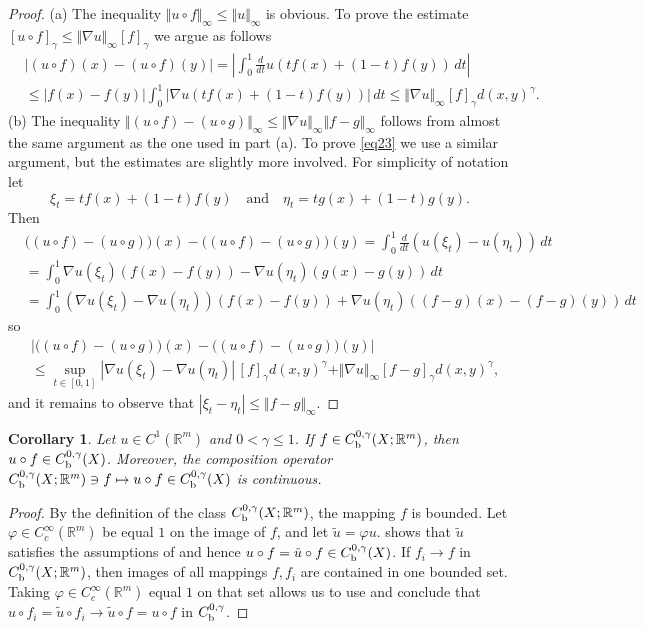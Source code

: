 \documentclass[intlimits,12pt,reqno]{amsart}
\newcommand{\bbbr}{\mathbb R}
\newcommand{\R}{\mathbb R}
\numberwithin{equation}{section}
\newtheorem{corollary}[theorem]{Corollary}
\theoremstyle{definition}
\begin{document}
\begin{proof}
(a) The inequality $\Vert u\circ f\Vert_\infty\leq \Vert u\Vert_\infty$ is obvious. To prove the estimate
$[u\circ f]_{\gamma}\leq\Vert\nabla u\Vert_\infty [f]_{\gamma}$ we argue as follows
\begin{align*}
&|(u\circ f)(x)-(u\circ f)(y)|
=
\left|\int_0^1\frac{d}{dt}u(tf(x)+(1-t)f(y))\, dt\right|\\
&\leq 
|f(x)-f(y)|\int_0^1|\nabla u(tf(x)+(1-t)f(y))|\, dt
\leq\Vert\nabla u\Vert_\infty [f]_{\gamma}d(x,y)^\gamma.
\end{align*}
\noindent (b)
The inequality 
$\Vert (u\circ f)-(u\circ g)\Vert_\infty\leq \Vert\nabla u\Vert_\infty\Vert f-g\Vert_\infty$ follows from almost the same argument as the one used in part (a). To prove \eqref{eq23} we use a similar argument, but the estimates are slightly more involved. For simplicity of notation let
$$
\xi_t=tf(x)+(1-t)f(y)
\quad
\text{and}
\quad
\eta_t=tg(x)+(1-t)g(y).
$$
Then
\begin{align*}
&
\big((u\circ f)-(u\circ g)\big)(x)-\big((u\circ f)-(u\circ g)\big)(y)
=
\int_0^1\frac{d}{dt}(u(\xi_t)-u(\eta_t))\, dt\\
&=
\int_0^1\nabla u(\xi_t)(f(x)-f(y))-\nabla u(\eta_t)(g(x)-g(y))\, dt\\
&=
\int_0^1(\nabla u(\xi_t)-\nabla u(\eta_t))(f(x)-f(y))+
\nabla u(\eta_t)((f-g)(x)-(f-g)(y))\, dt
\end{align*}
so
\begin{align*}
&
\big|\big((u\circ f)-(u\circ g)\big)(x)-\big((u\circ f)-(u\circ g)\big)(y)\big|\\
&\leq
\sup_{t\in [0,1]}|\nabla u(\xi_t)-\nabla u(\eta_t)|\, [f]_{\gamma}d(x,y)^\gamma +
\Vert \nabla u\Vert_\infty [f-g]_{\gamma}d(x,y)^\gamma,
\end{align*}
and it remains to observe that
$|\xi_t-\eta_t|\leq \Vert f-g\Vert_\infty$.
\end{proof}
\begin{corollary}
\label{T31}
Let $u\in C^1(\R^m)$ and $0<\gamma\leq 1$. If $f\in C^{0,\gamma}_{\rm b}(X;\R^m)$, then $u\circ f\in C_{\rm b}^{0,\gamma}(X)$.
Moreover, the composition operator $C^{0,\gamma}_{\rm b}(X;\R^m)\ni f\mapsto u\circ f\in C_{\rm b}^{0,\gamma}(X)$ is continuous.
\end{corollary}
\begin{proof}
By the definition of the class $C^{0,\gamma}_{\rm b}(X;\R^m)$, the mapping $f$ is bounded. 
Let $\varphi\in C_c^\infty(\bbbr^m)$ be equal $1$ on the image of $f$, and let $\tilde{u}=\varphi u$.  shows that $\tilde{u}$ satisfies the assumptions of  and hence
$u\circ f=\tilde{u}\circ f\in C_{\rm b}^{0,\gamma}(X)$. If $f_i\to f$ in $C^{0,\gamma}_{\rm b}(X;\R^m)$, then images of all mappings $f,f_i$ are contained in one bounded set. Taking $\varphi\in C_c^\infty(\bbbr^m)$ equal $1$ on that set allows us to use  and conclude that $u\circ f_i=\tilde{u}\circ f_i\to \tilde{u}\circ f=u\circ f$ in $C_{\rm b}^{0,\gamma}$.
\end{proof}
\end{document}
